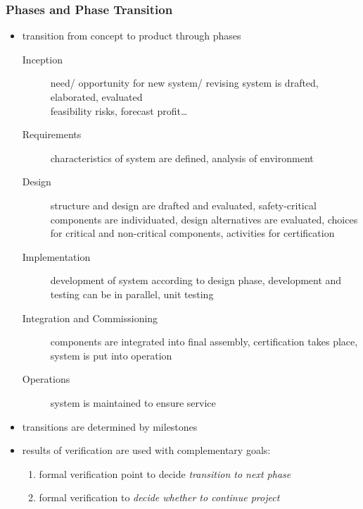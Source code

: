 \documentclass[a4paper, 10pt]{article}
\begin{document}
\subsubsection*{Phases and Phase Transition}
\begin{itemize}
    \item transition from concept to product through phases
    \begin{description}
        \item[Inception] need/ opportunity for new system/ revising system is drafted, elaborated, evaluated \\ feasibility risks, forecast profit\dots
        \item[Requirements] characteristics of system are defined, analysis of environment
        \item[Design] structure and design are drafted and evaluated, safety-critical components are individuated, design alternatives are evaluated, choices for critical and non-critical components, activities for certification
        \item[Implementation] development of system according to design phase, development and testing can be in parallel, unit testing
        \item[Integration and Commissioning] components are integrated into final assembly, certification takes place, system is put into operation
        \item[Operations] system is maintained to ensure service
    \end{description}
    \item transitions are determined by milestones
    \item results of verification are used with complementary goals:
    \begin{enumerate}
        \item formal verification point to decide \emph{transition to next phase}
        \item formal verification to \emph{decide whether to continue project}
    \end{enumerate}
\end{itemize}
\end{document}
